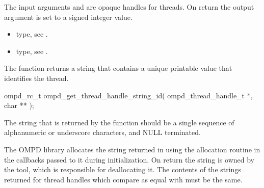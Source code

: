 %

\argdesc
The input arguments  and  are opaque handles for threads.
On return the output argument  is set to a signed integer value.

\crossreferences
\begin{itemize}
  \item {} type, see .
	\item {} type, see .
\end{itemize}

\label{subsubsubsec:ompd_get_thread_handle_string_id}
\summary
The  function returns a string
that contains a unique printable value that identifies the thread.

\format

\begin{cspecific}
\begin{ompSyntax}
ompd_rc_t ompd_get_thread_handle_string_id(
  ompd_thread_handle_t *,
  char **
);
\end{ompSyntax}
\end{cspecific}


\descr
The string that is returned by the function should be a single sequence of alphanumeric or
underscore characters, and NULL terminated.

The OMPD library allocates the string returned in  using the allocation
routine in the callbacks passed to it during initialization. On return the string is owned by the
tool, which is responsible for deallocating it. The contents of the strings returned for thread
handles which compare as equal with  must be the same.

